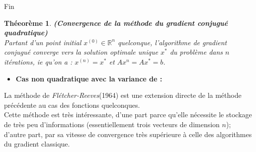 \documentclass[12pt,a4paper,openay]{book}
\numberwithin{equation}{chapter}
\newtheorem{theo}{Th\'eeor\`eme}[chapter]
\newcommand{\R}{\mathbb{R}}
\begin{document}
	Fin
	\begin{theo}
		\textbf{(Convergence de la m\'ethode du gradient conjugu\'e quadratique)}\\
		Partant d'un  point initial $x^{(0)}\in\R^n$ quelconque, l'algorithme de gradient conjugu\'e converge vers la solution optimale unique $x^*$ du probl\`eme dans $n$ it\'erations, ie qu'on a :
		$x^{(n)}=x^*$ et $Ax^n=Ax^*=b$.
	\end{theo}
	\begin{itemize}
		\item[$\bullet$] \textbf{\large Cas non quadratique avec la variance de  :}		 
	\end{itemize}
		La m\'ethode de \emph{Fl\'etcher-Reeves}(1964) est une extension directe de la m\'ethode pr\'ec\'edente au cas des fonctions quelconques.\\
		Cette m\'ethode est tr\`es int\'eressante, d'une part parce qu'elle n\'ecessite le stockage de tr\`es peu d'informations (essentiellement trois vecteurs de dimension $n$); d'autre part, par sa vitesse de convergence tr\`es sup\'erieure \`a celle des algorithmes du gradient classique.	
				
\end{document}
